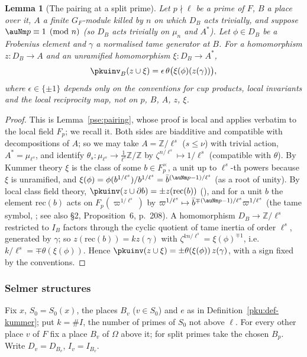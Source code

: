 \documentclass[10pt]{amsart}
\newtheorem{lemma}[theorem]{Lemma}
\theoremstyle{definition}
\theoremstyle{remark}
\newcommand{\Z}{\mathbb Z}
\begin{document}
\begin{lemma}[The pairing at a split prime]\label{pku:pairing}
Let $p\nmid\ell$ be a prime of $F$, $B$ a place over it, $A$ a finite $G_F$-module killed by $n$
on which $D_B$ acts trivially, and suppose $\auNm p\equiv1\pmod n$ (so $D_B$ acts trivially on
$\mu_n$ and $A^*$). Let $\phi\in D_B$ be a Frobenius element and $\gamma$ a normalised tame generator
at $B$. For a homomorphism $z\colon D_B\to A$ and an unramified homomorphism $\xi\colon D_B\to A^*$,
\[
\pkuinv_B(z\cup\xi)=\epsilon\,\theta\bigl(\xi(\phi)(z(\gamma))\bigr),
\]
where $\epsilon\in\{\pm1\}$ depends only on the conventions for cup products, local invariants and
the local reciprocity map, not on $p$, $B$, $A$, $z$, $\xi$.
\end{lemma}
\begin{proof}
This is Lemma~\ref{pse:pairing}, whose proof is local and applies verbatim to the local field
$F_p$; we recall it. Both sides are biadditive and compatible with decompositions of $A$; so we may
take $A=\Z/\ell^s$ ($s\le\nu$) with trivial action, $A^*=\mu_{\ell^s}$, and identify
$\theta_s\colon\mu_{\ell^s}\to\frac1{\ell^s}\Z/\Z$ by $\zeta^{n/\ell^s}\mapsto1/\ell^s$ (compatible
with $\theta$). By Kummer theory $\xi$ is the class of some $b\in F_p^\times$, a unit up to
$\ell^s$-th powers because $\xi$ is unramified, and $\xi(\phi)=\phi(b^{1/\ell^s})/b^{1/\ell^s}=
\bar b^{(\auNm p-1)/\ell^s}$ (as a root of unity). By local class field theory,
$\pkuinv(z\cup\partial b)=\pm z(\mathrm{rec}(b))$ (\cite[XIV, \S1, Proposition~3, p.~205]{SerreLF}), and for a unit $b$ the element $\mathrm{rec}(b)$ acts on $F_p(\varpi^{1/\ell^s})$
by $\varpi^{1/\ell^s}\mapsto\bar b^{\mp(\auNm p-1)/\ell^s}\varpi^{1/\ell^s}$ (the tame symbol,
\cite[Ch.~XIV, \S3, Proposition~8 and its Corollary, pp.~210--211]{SerreLF}; see also \S2, Proposition~6, p.~208). A homomorphism $D_B\to\Z/\ell^s$ restricted to $I_B$ factors through
the cyclic quotient of tame inertia of order $\ell^s$, generated by $\gamma$; so $z(\mathrm{rec}(b))
=kz(\gamma)$ with $\zeta^{kn/\ell^s}=\xi(\phi)^{\mp1}$, i.e.\ $k/\ell^s=\mp\theta(\xi(\phi))$. Hence
$\pkuinv(z\cup\xi)=\pm\theta(\xi(\phi))\,z(\gamma)$, with a sign fixed by the conventions.
\end{proof}

\subsubsection{Selmer structures}\label{pku:ss-selmer}

Fix $x$, $S_0=S_0(x)$, the places $B_v$ ($v\in S_0$) and $e$ as in Definition~\ref{pku:def-kummer};
put $k=\#I$, the number of primes of $S_0$ not above $\ell$. For every other place $v$ of $F$ fix a
place $B_v$ of $\Omega$ above it; for split primes take the chosen $B_p$. Write $D_v=D_{B_v}$,
$I_v=I_{B_v}$.
\end{document}
